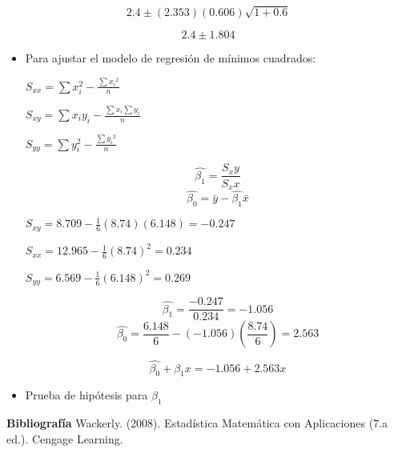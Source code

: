 \documentclass{../oxmathproblems}
\begin{document}
\begin{questions}
\begin{itemize}

$$ 2.4 \pm (2.353)(0.606)\sqrt{1+0.6} $$ 

$$ 2.4 \pm 1.804 $$ 
\end{itemize}

\miquestion 
\begin{itemize}
\item Para ajustar el modelo de regresión de mínimos cuadrados: 

$ S_{xx} = \sum{x_i^2} - \frac{\sum{x_i}^2}{n}$  

$ S_{xy} = \sum{x_iy_i} - \frac{\sum{x_i}\sum{y_i}}{n} $

$ S_{yy} = \sum{y_i^2} - \frac{\sum{y_i}^2}{n}$  

$$ \hat{\beta_1} = \frac{S_xy}{S_xx} $$ 
$$ \hat{\beta_0} = \bar{y} -\hat{\beta_1}\bar{x}  $$


$ S_{xy} = 8.709 - \frac{1}{6}(8.74)(6.148) = - 0.247 $ 

$ S_{xx} = 12.965 - \frac{1}{6}(8.74)^2 = 0.234 $ 

$ S_{yy} = 6.569 - \frac{1}{6}(6.148)^2 = 0.269 $ 

$$ \hat{\beta_1} = \frac{- 0.247}{0.234} = -1.056  $$ 
$$ \hat{\beta_0} =\frac{6.148}{6} - (-1.056)(\frac{8.74}{6}) = 2.563 $$ 


$$ \hat{\beta_0} + \hat{\beta_1}x =  -1.056 + 2.563x $$  

\item Prueba de hipótesis para $\beta_1$ 



\end{itemize}


\textbf{Bibliografía}
Wackerly. (2008). Estadística Matemática con Aplicaciones (7.a ed.). Cengage Learning.


\end{questions}
\end{document}
